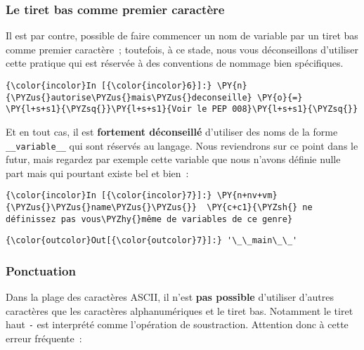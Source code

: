     \hypertarget{le-tiret-bas-comme-premier-caractuxe8re}{%
\subsubsection{Le tiret bas comme premier
caractère}\label{le-tiret-bas-comme-premier-caractuxe8re}}

    Il est par contre, possible de faire commencer un nom de variable par un
tiret bas comme premier caractère~; toutefois, à ce stade, nous vous
déconseillons d'utiliser cette pratique qui est réservée à des
conventions de nommage bien spécifiques.

    \begin{Verbatim}[commandchars=\\\{\},frame=single,framerule=0.3mm,rulecolor=\color{cellframecolor}]
{\color{incolor}In [{\color{incolor}6}]:} \PY{n}{\PYZus{}autorise\PYZus{}mais\PYZus{}deconseille} \PY{o}{=} \PY{l+s+s1}{\PYZsq{}}\PY{l+s+s1}{Voir le PEP 008}\PY{l+s+s1}{\PYZsq{}}
\end{Verbatim}


    Et en tout cas, il est \textbf{fortement déconseillé} d'utiliser des
noms de la forme \texttt{\_\_variable\_\_} qui sont réservés au langage.
Nous reviendrons sur ce point dans le futur, mais regardez par exemple
cette variable que nous n'avons définie nulle part mais qui pourtant
existe bel et bien~:

    \begin{Verbatim}[commandchars=\\\{\},frame=single,framerule=0.3mm,rulecolor=\color{cellframecolor}]
{\color{incolor}In [{\color{incolor}7}]:} \PY{n+nv+vm}{\PYZus{}\PYZus{}name\PYZus{}\PYZus{}}  \PY{c+c1}{\PYZsh{} ne définissez pas vous\PYZhy{}même de variables de ce genre}
\end{Verbatim}


\begin{Verbatim}[commandchars=\\\{\},frame=single,framerule=0.3mm,rulecolor=\color{cellframecolor}]
{\color{outcolor}Out[{\color{outcolor}7}]:} '\_\_main\_\_'
\end{Verbatim}
            
    \hypertarget{ponctuation}{%
\subsubsection{Ponctuation}\label{ponctuation}}

    Dans la plage des caractères ASCII, il n'est \textbf{pas possible}
d'utiliser d'autres caractères que les caractères alphanumériques et le
tiret bas. Notamment le tiret haut \texttt{-} est interprété comme
l'opération de soustraction. Attention donc à cette erreur fréquente~:

